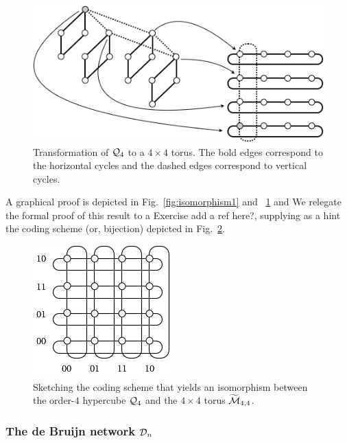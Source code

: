 \begin{figure}[hbt]
\begin{center}
       \includegraphics[scale=0.5]{FiguresGraph/Isomorphism2}
       \caption{Transformation of $\mbox{$\cal Q$}_4$ to a $4 \times 4$ torus.
       The bold edges correspond to the horizontal cycles and the dashed edges correspond to vertical cycles.}
  \label{fig:isomorphism2}
\end{center}
\end{figure}

A graphical proof is depicted in Fig.~\ref{fig:isomorphism1}  and ~\ref{fig:isomorphism2} and 
We relegate the formal proof of this result to a Exercise
{\Denis add a ref here?}, supplying as a
hint the coding scheme (or, bijection) depicted in
Fig.~\ref{fig:toruslabel}.
\begin{figure}[hbt]
\begin{center}
       \includegraphics[scale=0.6]{FiguresGraph/toruslabel}
\caption{Sketching the coding scheme that yields an isomorphism
  between the order-$4$ hypercube $\mbox{$\cal Q$}_4$ and the $4 \times                          
4$ torus $\widetilde{\mbox{$\cal M$}}_{4,4}$.}
  \label{fig:toruslabel}
\end{center}
\end{figure}


\subsubsection{The de Bruijn network $\mbox{$\cal D$}_n$}
\label{sec:deBruijn}

